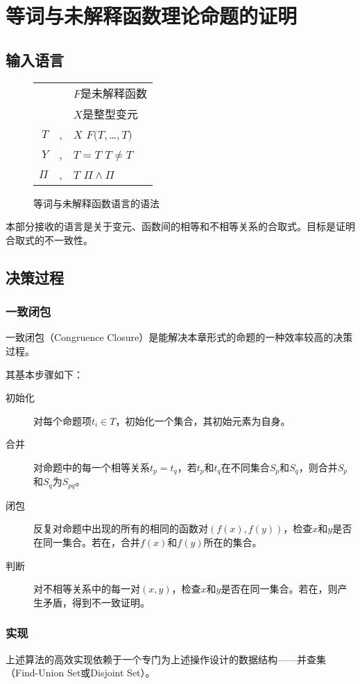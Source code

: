 \chapter{等词与未解释函数理论命题的证明}
\label{chap:euf}

\section{输入语言}
\begin{figure}[!htbp]
  \centering
  \begin{tabular}[rcl]{rcl}
    & & $F$是未解释函数 \\
    & & $X$是整型变元 \\
    $T$ & \sep & $X$ \deli{} $F(T,$\ldots$,T)$ \\
    $Y$ & \sep{} & $T = T$ \deli{} $T \neq T$ \\
    $\Pi$ & \sep{} & $T$ \deli{} $\Pi \land \Pi$ \\
  \end{tabular}
  \caption{等词与未解释函数语言的语法}
  \label{euf:syntax}
\end{figure}
本部分接收的语言是关于变元、函数间的相等和不相等关系的合取式。目标是证明合取式的不一致性。

\section{决策过程}
\subsection{一致闭包}
一致闭包（Congruence Closure）是能解决本章形式的命题的一种效率较高的决策过程。

其基本步骤如下：
\begin{description}
\item[初始化] 对每个命题项$t_i \in T$，初始化一个集合，其初始元素为自身。
\item[合并] 对命题中的每一个相等关系$t_p = t_q$，若$t_p$和$t_q$在不同集合$S_p$和$S_q$，则合并$S_p$和$S_q$为$S_{pq}$。
\item[闭包] 反复对命题中出现的所有的相同的函数对$(f(x), f(y))$，检查$x$和$y$是否在同一集合。若在，合并$f(x)$和$f(y)$所在的集合。
\item[判断] 对不相等关系中的每一对$(x, y)$，检查$x$和$y$是否在同一集合。若在，则产生矛盾，得到不一致证明。
\end{description}

\subsection{实现}
上述算法的高效实现依赖于一个专门为上述操作设计的数据结构——并查集（Find-Union Set或Disjoint Set）。

